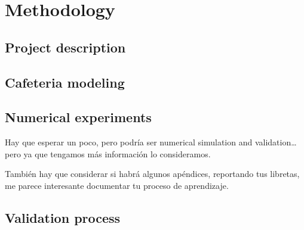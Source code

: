 \chapter{Methodology}
\label{chap:methodology}

 
 
 \section{Project description}
 
 \section{Cafeteria modeling}
 
 \section{Numerical experiments}
 
 Hay que esperar un poco, pero podría ser numerical simulation and validation… pero ya que tengamos más información lo consideramos.


También hay que considerar si habrá algunos apéndices, reportando tus libretas, me parece interesante documentar tu proceso de aprendizaje.
 
 \section{Validation process}
 
